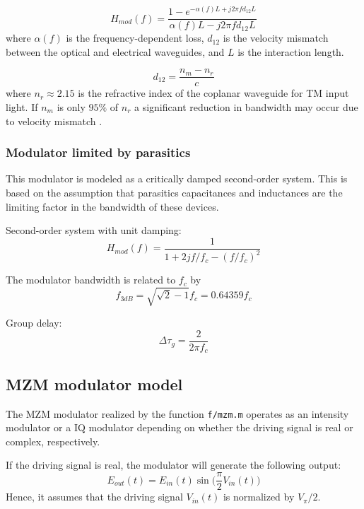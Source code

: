 \documentclass[a4paper]{article}
\begin{document}
\begin{equation}
H_{mod}(f) = \frac{1-e^{-\alpha(f)L+j2\pi fd_{12}L}}{\alpha(f)L-j2\pi fd_{12}L}
\end{equation}
where $\alpha(f)$ is the frequency-dependent loss, $d_{12}$ is the velocity mismatch between the optical and electrical waveguides, and $L$ is the interaction length.

\begin{equation}
d_{12} = \frac{n_m-n_r}{c}
\end{equation}
where $n_r \approx 2.15$ is the refractive index of the coplanar waveguide for TM input light. If $n_m$ is only $95\%$ of $n_r$ a significant reduction in bandwidth may occur due to velocity mismatch \cite{Ho2005}.

\subsubsection{Modulator limited by parasitics}
This modulator is modeled as a critically damped second-order system. This is based on the assumption that parasitics capacitances and inductances are the limiting factor in the bandwidth of these devices.

Second-order system with unit damping:
\begin{equation}
H_{mod}(f) =  \frac{1}{1 + 2jf/f_c - (f/f_c)^2}
\end{equation}

The modulator bandwidth is related to $f_c$ by
\begin{equation}
f_{3dB} = \sqrt{\sqrt{2}-1}f_c = 0.64359f_c
\end{equation}

Group delay:
\begin{equation}
\Delta\tau_g = \frac{2}{2\pi f_c}
\end{equation}

\subsection{MZM modulator model}

The MZM modulator realized by the function \texttt{f/mzm.m} operates as an intensity modulator or a IQ modulator depending on whether the driving signal is real or complex, respectively. 

If the driving signal is real, the modulator will generate the following output:
\begin{equation}
E_{out}(t) = E_{in}(t)\sin\Big(\frac{\pi}{2}V_{in}(t)\Big)
\end{equation}
Hence, it assumes that the driving signal $V_{in}(t)$ is normalized by $V_{\pi}/2$.
\end{document}
